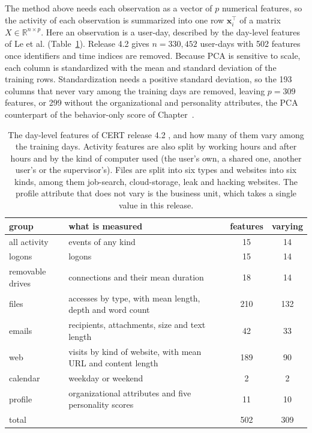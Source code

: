 \documentclass[12pt]{report}
\newcommand{\chref}[1]{Chapter~\uppercase\expandafter{\romannumeral\getrefnumber{#1}}}
\begin{document}
The method above needs each observation as a vector of $p$ numerical features, so the
activity of each observation is summarized into one row $\mathbf{x}_i^\top$ of a matrix
$X \in \mathbb{R}^{n\times p}$. Here an observation is a user-day, described by the day-level
features of Le et al. \cite{le2020analyzing} (Table~\ref{tab:pca-features}). Release 4.2 gives
$n = 330{,}452$ user-days with 502 features once identifiers and time indices are removed.
Because PCA is sensitive to scale, each column is standardized with the mean and standard
deviation of the training rows. Standardization needs a positive standard deviation, so the 193
columns that never vary among the training days are removed, leaving $p = 309$ features, or 299
without the organizational and personality attributes, the PCA counterpart of the behavior-only
score of \chref{ch:lm}.

\begin{table}[!htbp]
\centering
\caption[CERT feature groups and training variability]{The day-level features of CERT release 4.2 \cite{le2020analyzing}, and how many of them
vary among the training days. Activity features are also split by working hours and after hours
and by the kind of computer used (the user's own, a shared one, another user's or the
supervisor's). Files are split into six types and websites into six kinds, among them job-search,
cloud-storage, leak and hacking websites. The profile attribute that does not vary is the business
unit, which takes a single value in this release.}
\label{tab:pca-features}
\begin{tabular}{l>{\raggedright\arraybackslash}p{8.4cm}cc}
\toprule
group & what is measured & features & varying \\
\midrule
all activity & events of any kind & 15 & 14 \\
logons & logons & 15 & 14 \\
removable drives & connections and their mean duration & 18 & 14 \\
files & accesses by type, with mean length, depth and word count & 210 & 132 \\
emails & recipients, attachments, size and text length & 42 & 33 \\
web & visits by kind of website, with mean URL and content length & 189 & 90 \\
calendar & weekday or weekend & 2 & 2 \\
profile & organizational attributes and five personality scores & 11 & 10 \\
\midrule
total & & 502 & 309 \\
\bottomrule
\end{tabular}
\end{table}
\end{document}
